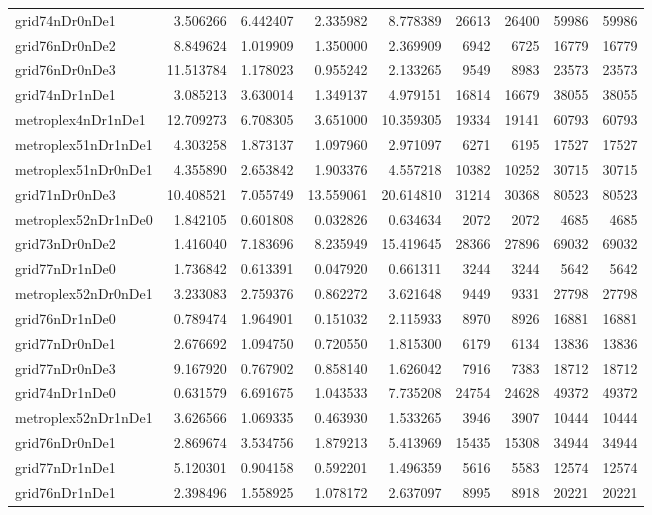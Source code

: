 \begin{longtable}{|l|r|r|r|r|r|r|r|r|}
grid74nDr0nDe1 & 3.506266 & 6.442407 & 2.335982 & 8.778389 & 26613 & 26400 & 59986 & 59986 \\
grid76nDr0nDe2 & 8.849624 & 1.019909 & 1.350000 & 2.369909 & 6942 & 6725 & 16779 & 16779 \\
grid76nDr0nDe3 & 11.513784 & 1.178023 & 0.955242 & 2.133265 & 9549 & 8983 & 23573 & 23573 \\
grid74nDr1nDe1 & 3.085213 & 3.630014 & 1.349137 & 4.979151 & 16814 & 16679 & 38055 & 38055 \\
metroplex4nDr1nDe1 & 12.709273 & 6.708305 & 3.651000 & 10.359305 & 19334 & 19141 & 60793 & 60793 \\
metroplex51nDr1nDe1 & 4.303258 & 1.873137 & 1.097960 & 2.971097 & 6271 & 6195 & 17527 & 17527 \\
metroplex51nDr0nDe1 & 4.355890 & 2.653842 & 1.903376 & 4.557218 & 10382 & 10252 & 30715 & 30715 \\
grid71nDr0nDe3 & 10.408521 & 7.055749 & 13.559061 & 20.614810 & 31214 & 30368 & 80523 & 80523 \\
metroplex52nDr1nDe0 & 1.842105 & 0.601808 & 0.032826 & 0.634634 & 2072 & 2072 & 4685 & 4685 \\
grid73nDr0nDe2 & 1.416040 & 7.183696 & 8.235949 & 15.419645 & 28366 & 27896 & 69032 & 69032 \\
grid77nDr1nDe0 & 1.736842 & 0.613391 & 0.047920 & 0.661311 & 3244 & 3244 & 5642 & 5642 \\
metroplex52nDr0nDe1 & 3.233083 & 2.759376 & 0.862272 & 3.621648 & 9449 & 9331 & 27798 & 27798 \\
grid76nDr1nDe0 & 0.789474 & 1.964901 & 0.151032 & 2.115933 & 8970 & 8926 & 16881 & 16881 \\
grid77nDr0nDe1 & 2.676692 & 1.094750 & 0.720550 & 1.815300 & 6179 & 6134 & 13836 & 13836 \\
grid77nDr0nDe3 & 9.167920 & 0.767902 & 0.858140 & 1.626042 & 7916 & 7383 & 18712 & 18712 \\
grid74nDr1nDe0 & 0.631579 & 6.691675 & 1.043533 & 7.735208 & 24754 & 24628 & 49372 & 49372 \\
metroplex52nDr1nDe1 & 3.626566 & 1.069335 & 0.463930 & 1.533265 & 3946 & 3907 & 10444 & 10444 \\
grid76nDr0nDe1 & 2.869674 & 3.534756 & 1.879213 & 5.413969 & 15435 & 15308 & 34944 & 34944 \\
grid77nDr1nDe1 & 5.120301 & 0.904158 & 0.592201 & 1.496359 & 5616 & 5583 & 12574 & 12574 \\
grid76nDr1nDe1 & 2.398496 & 1.558925 & 1.078172 & 2.637097 & 8995 & 8918 & 20221 & 20221 \\

\end{longtable}
